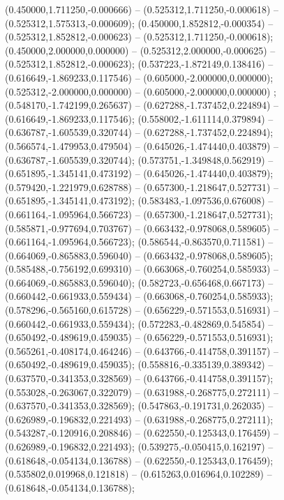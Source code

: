  (0.450000,1.711250,-0.000666) -- (0.525312,1.711250,-0.000618) -- (0.525312,1.575313,-0.000609);
 (0.450000,1.852812,-0.000354) -- (0.525312,1.852812,-0.000623) -- (0.525312,1.711250,-0.000618);
 (0.450000,2.000000,0.000000) -- (0.525312,2.000000,-0.000625) -- (0.525312,1.852812,-0.000623);
 (0.537223,-1.872149,0.138416) -- (0.616649,-1.869233,0.117546) -- (0.605000,-2.000000,0.000000);
 (0.525312,-2.000000,0.000000) -- (0.605000,-2.000000,0.000000) ;
 (0.548170,-1.742199,0.265637) -- (0.627288,-1.737452,0.224894) -- (0.616649,-1.869233,0.117546);
 (0.558002,-1.611114,0.379894) -- (0.636787,-1.605539,0.320744) -- (0.627288,-1.737452,0.224894);
 (0.566574,-1.479953,0.479504) -- (0.645026,-1.474440,0.403879) -- (0.636787,-1.605539,0.320744);
 (0.573751,-1.349848,0.562919) -- (0.651895,-1.345141,0.473192) -- (0.645026,-1.474440,0.403879);
 (0.579420,-1.221979,0.628788) -- (0.657300,-1.218647,0.527731) -- (0.651895,-1.345141,0.473192);
 (0.583483,-1.097536,0.676008) -- (0.661164,-1.095964,0.566723) -- (0.657300,-1.218647,0.527731);
 (0.585871,-0.977694,0.703767) -- (0.663432,-0.978068,0.589605) -- (0.661164,-1.095964,0.566723);
 (0.586544,-0.863570,0.711581) -- (0.664069,-0.865883,0.596040) -- (0.663432,-0.978068,0.589605);
 (0.585488,-0.756192,0.699310) -- (0.663068,-0.760254,0.585933) -- (0.664069,-0.865883,0.596040);
 (0.582723,-0.656468,0.667173) -- (0.660442,-0.661933,0.559434) -- (0.663068,-0.760254,0.585933);
 (0.578296,-0.565160,0.615728) -- (0.656229,-0.571553,0.516931) -- (0.660442,-0.661933,0.559434);
 (0.572283,-0.482869,0.545854) -- (0.650492,-0.489619,0.459035) -- (0.656229,-0.571553,0.516931);
 (0.565261,-0.408174,0.464246) -- (0.643766,-0.414758,0.391157) -- (0.650492,-0.489619,0.459035);
 (0.558816,-0.335139,0.389342) -- (0.637570,-0.341353,0.328569) -- (0.643766,-0.414758,0.391157);
 (0.553028,-0.263067,0.322079) -- (0.631988,-0.268775,0.272111) -- (0.637570,-0.341353,0.328569);
 (0.547863,-0.191731,0.262035) -- (0.626989,-0.196832,0.221493) -- (0.631988,-0.268775,0.272111);
 (0.543287,-0.120916,0.208846) -- (0.622550,-0.125343,0.176459) -- (0.626989,-0.196832,0.221493);
 (0.539275,-0.050415,0.162197) -- (0.618648,-0.054134,0.136788) -- (0.622550,-0.125343,0.176459);
 (0.535802,0.019968,0.121818) -- (0.615263,0.016964,0.102289) -- (0.618648,-0.054134,0.136788);
